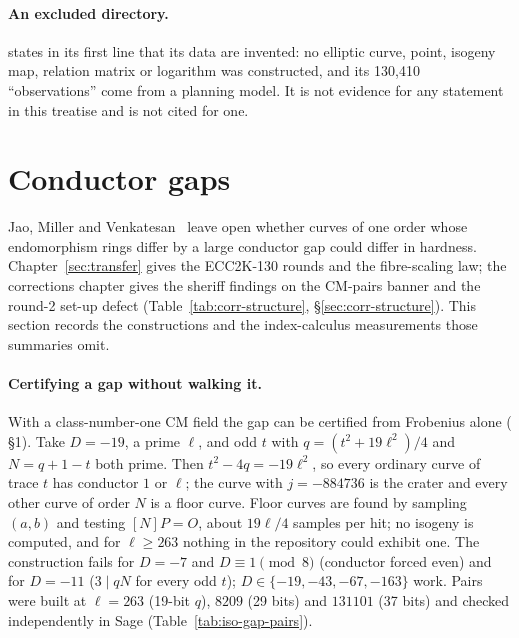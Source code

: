 \paragraph{An excluded directory.} 
states in its first line that its data are invented: no elliptic curve,
point, isogeny map, relation matrix or logarithm was constructed, and its
130{,}410 ``observations'' come from a planning model. It is not evidence
for any statement in this treatise and is not cited for one.

\section{Conductor gaps}\label{sec:iso-conductor}

Jao, Miller and Venkatesan~\cite{jmv2005} leave open whether curves of one
order whose endomorphism rings differ by a large conductor gap could differ
in hardness. Chapter~\ref{sec:transfer} gives the ECC2K-130 rounds and the
fibre-scaling law; the corrections chapter gives the sheriff findings on the
CM-pairs banner and the round-2 set-up defect (Table~\ref{tab:corr-structure},
\S\ref{sec:corr-structure}). This section records the constructions and the
index-calculus measurements those summaries omit.

\paragraph{Certifying a gap without walking it.} With a class-number-one CM
field the gap can be certified from Frobenius alone
( \S1). Take
$D=-19$, a prime $\ell$, and odd $t$ with $q=(t^2+19\ell^2)/4$ and
$N=q+1-t$ both prime. Then $t^2-4q=-19\ell^2$, so every ordinary curve of
trace $t$ has conductor $1$ or $\ell$; the curve with $j=-884736$ is the
crater and every other curve of order $N$ is a floor curve. Floor curves are
found by sampling $(a,b)$ and testing $[N]P=O$, about $19\ell/4$ samples per
hit; no isogeny is computed, and for $\ell\ge263$ nothing in the repository
could exhibit one. The construction fails for $D=-7$ and $D\equiv1\pmod8$
(conductor forced even) and for $D=-11$ ($3\mid qN$ for every odd $t$);
$D\in\{-19,-43,-67,-163\}$ work. Pairs were built at $\ell=263$ (19-bit
$q$), $8209$ (29 bits) and $131101$ (37 bits) and checked independently in
Sage (Table~\ref{tab:iso-gap-pairs}).

